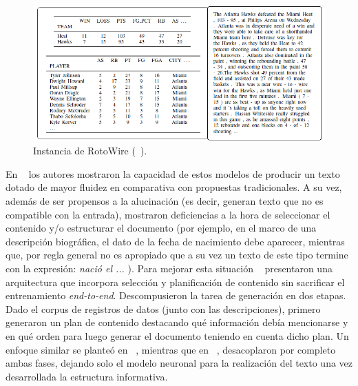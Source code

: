         \begin{figure}[!]
            \begin{center}
                \includegraphics[width=\textwidth]{Graphics/rotowire_instancia.png}
            \end{center}
            \caption{Instancia de RotoWire (~\cite{wiseman-etal-2017-challenges}).}
            \label{fig_RotoWire}
        \end{figure}

 En ~\cite{wiseman-etal-2017-challenges} los autores mostraron la capacidad de estos modelos de producir un texto dotado de mayor 
fluidez en comparativa con propuestas tradicionales. A su vez, además de ser propensos a la alucinación (es decir, generan texto que no es compatible con la entrada), 
mostraron  deficiencias a la hora de seleccionar el contenido y/o estructurar el documento (por ejemplo, en el marco de una descripción biográfica, el dato de la fecha de nacimiento debe 
aparecer, mientras que, por regla general no es apropiado que a su vez un texto de este tipo termine con la expresión: \textit{nació el ...} ). Para mejorar esta situación ~\cite{puduppully2019dataselandplan}  
presentaron una arquitectura que incorpora selección y planificación de contenido sin sacrificar el entrenamiento \emph{end-to-end}. Descompusieron la tarea de generación en dos etapas. Dado el corpus de 
registros de datos (junto con las descripciones), primero generaron un plan de contenido destacando qué información debía mencionarse y en qué orden para luego generar el documento teniendo en 
cuenta dicho plan. Un enfoque similar se planteó en ~\cite{chen2021neural}, mientras que en ~\cite{moryossef2019step}, desacoplaron por completo ambas fases, dejando solo el modelo neuronal para la realización del 
texto una vez desarrollada la estructura informativa.

